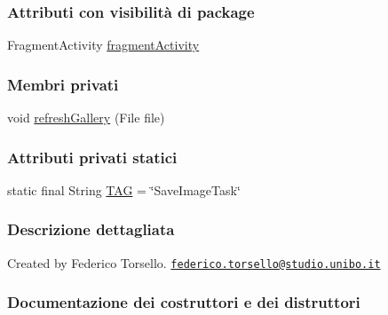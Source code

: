 \subsubsection*{Attributi con visibilità di package}
\begin{DoxyCompactItemize}
\item 
Fragment\+Activity \hyperlink{classit_1_1unibo_1_1torsello_1_1bluetoothpositioning_1_1examplesCamera_1_1SaveImageTask_a020c67ae36b7f908c900da193d9cd110_a020c67ae36b7f908c900da193d9cd110}{fragment\+Activity}
\end{DoxyCompactItemize}
\subsubsection*{Membri privati}
\begin{DoxyCompactItemize}
\item 
void \hyperlink{classit_1_1unibo_1_1torsello_1_1bluetoothpositioning_1_1examplesCamera_1_1SaveImageTask_a8bcd9bba7269b952dd0a06bdc3381c25_a8bcd9bba7269b952dd0a06bdc3381c25}{refresh\+Gallery} (File file)
\end{DoxyCompactItemize}
\subsubsection*{Attributi privati statici}
\begin{DoxyCompactItemize}
\item 
static final String \hyperlink{classit_1_1unibo_1_1torsello_1_1bluetoothpositioning_1_1examplesCamera_1_1SaveImageTask_a908ad84901185def0257ea5288f64c3c_a908ad84901185def0257ea5288f64c3c}{T\+AG} = \char`\"{}Save\+Image\+Task\char`\"{}
\end{DoxyCompactItemize}


\subsubsection{Descrizione dettagliata}
Created by Federico Torsello. \href{mailto:federico.torsello@studio.unibo.it}{\tt federico.\+torsello@studio.\+unibo.\+it} 

\subsubsection{Documentazione dei costruttori e dei distruttori}
\hypertarget{classit_1_1unibo_1_1torsello_1_1bluetoothpositioning_1_1examplesCamera_1_1SaveImageTask_a8d08d12c0e15cc34f4dbfcefc0931629_a8d08d12c0e15cc34f4dbfcefc0931629}{}\label{classit_1_1unibo_1_1torsello_1_1bluetoothpositioning_1_1examplesCamera_1_1SaveImageTask_a8d08d12c0e15cc34f4dbfcefc0931629_a8d08d12c0e15cc34f4dbfcefc0931629} 
